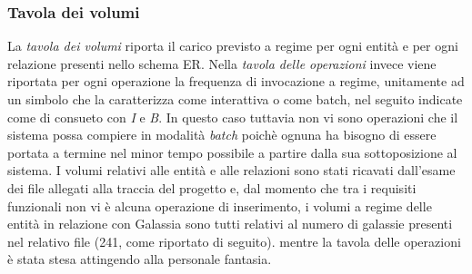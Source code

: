 \documentclass[12pt,a4paper,onecolumn,x11names]{article}
\begin{document}
	\subsubsection{Tavola dei volumi}
		\begin{flushleft}
				La \textit{tavola dei volumi} riporta il carico previsto a regime per ogni entità e per ogni relazione presenti nello schema ER. Nella \textit{tavola delle operazioni} invece viene riportata per ogni operazione la frequenza di invocazione a regime, unitamente ad un simbolo che la caratterizza come interattiva o come batch, nel seguito indicate come di consueto con \textit{I} e \textit{B}. In questo caso tuttavia non vi sono operazioni che il sistema possa compiere in modalità \textit{batch} poichè ognuna ha bisogno di essere portata a termine nel minor tempo possibile a partire dalla sua sottoposizione al sistema.\newline
				I volumi relativi alle entità e alle relazioni sono stati ricavati dall'esame dei file allegati alla traccia del progetto e, dal momento che tra i requisiti funzionali non vi è alcuna operazione di inserimento, i volumi a regime delle entità in relazione con Galassia  sono tutti relativi al numero di galassie presenti nel relativo file (241, come riportato di seguito).\newline
				mentre la tavola delle operazioni è stata stesa attingendo alla personale fantasia.
		\end{flushleft}
\end{document}
